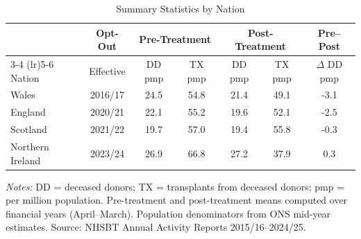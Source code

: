 \begin{table}[htbp]
\centering
\caption{Summary Statistics by Nation}
\label{tab:summary}
\begin{threeparttable}
\begin{tabular}{lcccccc}
\toprule
 & Opt-Out & \multicolumn{2}{c}{Pre-Treatment} & \multicolumn{2}{c}{Post-Treatment} & Pre--Post \\
\cmidrule(lr){3-4} \cmidrule(lr){5-6}
Nation & Effective & DD pmp & TX pmp & DD pmp & TX pmp & $\Delta$ DD pmp \\
\midrule
Wales & 2016/17 & 24.5 & 54.8 & 21.4 & 49.1 & -3.1 \\
England & 2020/21 & 22.1 & 55.2 & 19.6 & 52.1 & -2.5 \\
Scotland & 2021/22 & 19.7 & 57.0 & 19.4 & 55.8 & -0.3 \\
Northern Ireland & 2023/24 & 26.9 & 66.8 & 27.2 & 37.9 & 0.3 \\
\bottomrule
\end{tabular}
\begin{tablenotes}[flushleft]\footnotesize
\item \textit{Notes:} DD = deceased donors; TX = transplants from deceased donors; pmp = per million population. Pre-treatment and post-treatment means computed over financial years (April--March). Population denominators from ONS mid-year estimates. Source: NHSBT Annual Activity Reports 2015/16--2024/25.
\end{tablenotes}
\end{threeparttable}
\end{table}
